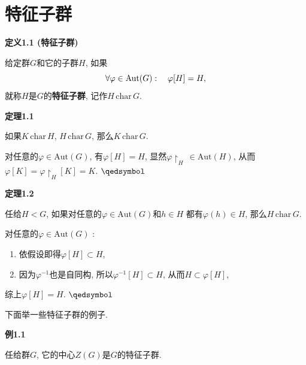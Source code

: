 \documentclass[UTF8]{ctexart}
\begin{document}
\setlength{\abovedisplayskip}{1pt}
\setlength{\belowdisplayskip}{1pt}

\section{特征子群}

\hypertarget{sec:定义1.1}{}
\noindent\textbf{定义1.1 (特征子群)}

给定群$G$和它的子群$H$, 如果
\vspace{-3pt}
\[
    \forall\varphi\in\mathrm{Aut}(G):\quad\varphi[H]=H,\\[-3pt]
\]
就称$H$是$G$的\textbf{特征子群}, 记作$H\,\mathrm{char}\,G$.

\vspace{10pt}

\hypertarget{sec:定理1.1}{}
\noindent\textbf{定理1.1}

如果$K\,\mathrm{char}\,H$, $H\,\mathrm{char}\,G$, 那么$K\,\mathrm{char}\,G$.


对任意的$\varphi\in\mathrm{Aut}(G)$, 有$\varphi[H]=H$,
显然$\varphi\!\restriction_{H}\,\in\mathrm{Aut}(H)$, 从而
$\varphi[K]=\varphi\!\restriction_{H}[K]=K$. \hfill $\qedsymbol$

\vspace{10pt}

\hypertarget{sec:定理1.2}{}
\noindent\textbf{定理1.2}

任给$H<G$, 如果对任意的$\varphi\in\mathrm{Aut}(G)$和$h\in H$
都有$\varphi(h)\in H$, 那么$H\,\mathrm{char}\,G$.


对任意的$\varphi\in\mathrm{Aut}(G)$ :
\begin{enumerate}
    \item 依假设即得$\varphi[H]\subset H$,
    \item 因为$\varphi^{-1}$也是自同构, 所以$\varphi^{-1}[H]\subset H$,
    从而$H\subset\varphi[H]$,
\end{enumerate}
综上$\varphi[H]=H$. \hfill $\qedsymbol$

\vspace{15pt}

下面举一些特征子群的例子.

\vspace{10pt}

\hypertarget{sec:例1.1}{}
\noindent\textbf{例1.1}

任给群$G$, 它的中心$Z(G)$是$G$的特征子群.
\end{document}
